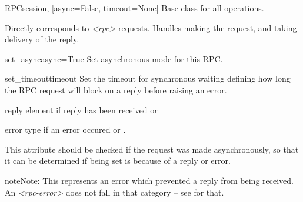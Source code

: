 \documentclass[a4paper,10pt,english]{manual}
\begin{document}
\hypertarget{ncclient.operations.rpc.RPC}{}\begin{classdesc}{RPC}{session, {[}async=False, timeout=None{]}}
Base class for all operations.

Directly corresponds to \emph{\textless{}rpc\textgreater{}} requests. Handles making the request, and
taking delivery of the reply.

\hypertarget{ncclient.operations.rpc.RPC.set_async}{}\begin{methoddesc}{set\_async}{async=True}
Set asynchronous mode for this RPC.
\end{methoddesc}

\hypertarget{ncclient.operations.rpc.RPC.set_timeout}{}\begin{methoddesc}{set\_timeout}{timeout}
Set the timeout for synchronous waiting defining how long the RPC
request will block on a reply before raising an error.
\end{methoddesc}

\hypertarget{ncclient.operations.rpc.RPC.reply}{}\begin{memberdesc}{reply}
\hyperlink{ncclient.operations.rpc.RPCReply}{} element if reply has been received or \href{http://docs.python.org/library/constants.html\#None}{}
\end{memberdesc}

\hypertarget{ncclient.operations.rpc.RPC.error}{}\begin{memberdesc}{error}
\href{http://docs.python.org/library/exceptions.html\#exceptions.Exception}{} type if an error occured or \href{http://docs.python.org/library/constants.html\#None}{}.

This attribute should be checked if the request was made asynchronously,
so that it can be determined if \hyperlink{ncclient.operations.rpc.RPC.event}{} being set is because of a
reply or error.

\begin{notice}{note}{Note:}
This represents an error which prevented a reply from being
received. An \emph{\textless{}rpc-error\textgreater{}} does not fall in that category -- see
\hyperlink{ncclient.operations.rpc.RPCReply}{} for that.
\end{notice}
\end{memberdesc}


\end{classdesc}
\end{document}
